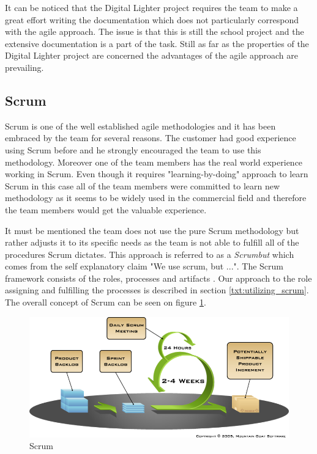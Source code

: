 It can be noticed that the Digital Lighter project requires the team to make a great effort writing the documentation which does not particularly correspond with the agile approach. The issue is that this is still the school project and the extensive documentation is a part of the task. Still as far as the properties of the Digital Lighter project are concerned the advantages of the agile approach are prevailing.

\subsection{Scrum} \label{subsec:scrum}
Scrum is one of the well established agile methodologies and it has been embraced by the team for several reasons. The customer had good experience using Scrum before and he strongly encouraged the team to use this methodology. Moreover one of the team members has the real world experience working in Scrum. Even though it requires "learning-by-doing" approach to learn Scrum in this case all of the  team members were committed to learn new methodology as it seems to be widely used in the commercial field and therefore the team members would get the valuable experience.

It must be mentioned the team does not use the pure Scrum methodology but rather adjusts it to its specific needs as the team is not able to fulfill all of the procedures Scrum dictates. This approach is referred to as a \textit{Scrumbut} \cite{viscardi2013professional} which comes from the self explanatory claim "We use scrum, but ...".  The Scrum framework consists of the roles, processes and artifacts \cite{viscardi2013professional}. Our approach to the role assigning and fulfilling the processes is described in section \ref{txt:utilizing_scrum}. The overall concept of Scrum can be seen on figure \ref{fig:scrum}.

\begin{figure}[hbt]
\centering
\includegraphics[width=\textwidth]{preliminaryStudies/scrum.png}
\caption{Scrum}
\label{fig:scrum}
\end{figure}

